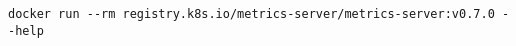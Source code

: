 \begin{verbatim}
docker run --rm registry.k8s.io/metrics-server/metrics-server:v0.7.0 --help
\end{verbatim}
